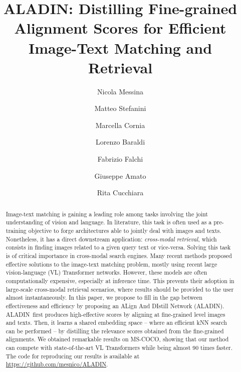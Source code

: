 \documentclass[sigconf]{acmart}
\newcommand{\ourmodel}{ALADIN}    \settopmatter{authorsperrow=4}
\begin{document}
\title{ALADIN: Distilling Fine-grained Alignment Scores for Efficient Image-Text Matching and Retrieval}



\author{Nicola Messina}

\author{Matteo Stefanini}

\author{Marcella Cornia}

\author{Lorenzo Baraldi}

\author{Fabrizio Falchi}

\author{Giuseppe Amato}

\author{Rita Cucchiara}



\renewcommand{\shortauthors}{N. Messina, et al.}

\begin{abstract}
Image-text matching is gaining a leading role among tasks involving the joint understanding of vision and language. In literature, this task is often used as a pre-training objective to forge architectures able to jointly deal with images and texts. Nonetheless, it has a direct downstream application: \textit{cross-modal retrieval}, which consists in finding images related to a given query text or vice-versa.
Solving this task is of critical importance in cross-modal search engines.
Many recent methods proposed effective solutions to the image-text matching problem, mostly using recent large vision-language (VL) Transformer networks. However, these models are often computationally expensive, especially at inference time. This prevents their adoption in large-scale cross-modal retrieval scenarios, where results should be provided to the user almost instantaneously. In this paper, we propose to fill in the gap between effectiveness and efficiency by proposing an ALign And DIstill Network (\ourmodel). \ourmodel\ first produces high-effective scores by aligning at fine-grained level images and texts. Then, it learns a shared embedding space -- where an efficient kNN search can be performed -- by distilling the relevance scores obtained from the fine-grained alignments. We obtained remarkable results on MS-COCO, showing that our method can compete with state-of-the-art VL Transformers while being almost 90 times faster. The code for reproducing our results is available at \url{https://github.com/mesnico/ALADIN}.
\end{abstract}
\end{document}
